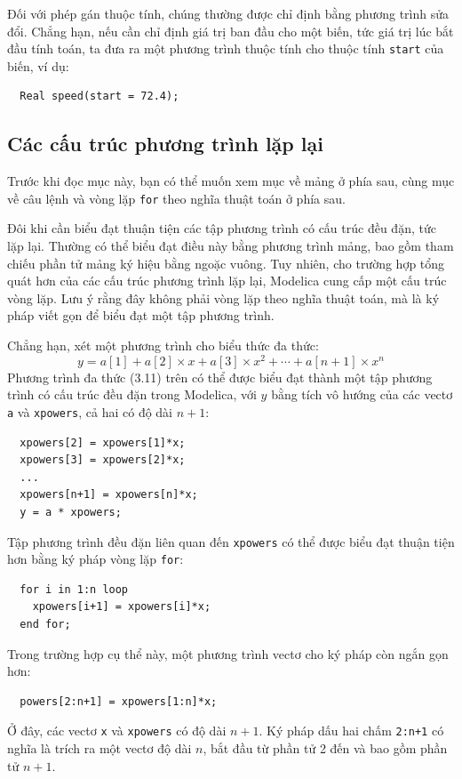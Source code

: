 Đối với phép gán thuộc tính, chúng thường được chỉ định bằng phương trình sửa đổi. Chẳng hạn, nếu cần chỉ định giá trị ban đầu cho một biến, tức giá trị lúc bắt đầu tính toán, ta đưa ra một phương trình thuộc tính cho thuộc tính \texttt{start} của biến, ví dụ:
\begin{verbatim}
  Real speed(start = 72.4);
\end{verbatim}

\subsection{Các cấu trúc phương trình lặp lại}
Trước khi đọc mục này, bạn có thể muốn xem mục về mảng ở phía sau, cùng mục về câu lệnh và vòng lặp \texttt{for} theo nghĩa thuật toán ở phía sau.

Đôi khi cần biểu đạt thuận tiện các tập phương trình có cấu trúc đều đặn, tức lặp lại. Thường có thể biểu đạt điều này bằng phương trình mảng, bao gồm tham chiếu phần tử mảng ký hiệu bằng ngoặc vuông. Tuy nhiên, cho trường hợp tổng quát hơn của các cấu trúc phương trình lặp lại, Modelica cung cấp một cấu trúc vòng lặp. Lưu ý rằng đây không phải vòng lặp theo nghĩa thuật toán, mà là ký pháp viết gọn để biểu đạt một tập phương trình.

Chẳng hạn, xét một phương trình cho biểu thức đa thức:
\begin{equation}
y=a[1]+a[2]\times x+a[3]\times x^2+\cdots+a[n+1]\times x^n\tag{3.11}
\end{equation}
Phương trình đa thức (3.11) trên có thể được biểu đạt thành một tập phương trình có cấu trúc đều đặn trong Modelica, với $y$ bằng tích vô hướng của các vectơ \texttt{a} và \texttt{xpowers}, cả hai có độ dài $n+1$:
\begin{verbatim}
  xpowers[2] = xpowers[1]*x;
  xpowers[3] = xpowers[2]*x;
  ...
  xpowers[n+1] = xpowers[n]*x;
  y = a * xpowers;
\end{verbatim}
Tập phương trình đều đặn liên quan đến \texttt{xpowers} có thể được biểu đạt thuận tiện hơn bằng ký pháp vòng lặp \texttt{for}:
\begin{verbatim}
  for i in 1:n loop
    xpowers[i+1] = xpowers[i]*x;
  end for;
\end{verbatim}
Trong trường hợp cụ thể này, một phương trình vectơ cho ký pháp còn ngắn gọn hơn:
\begin{verbatim}
  powers[2:n+1] = xpowers[1:n]*x;
\end{verbatim}
Ở đây, các vectơ \texttt{x} và \texttt{xpowers} có độ dài $n+1$. Ký pháp dấu hai chấm \texttt{2:n+1} có nghĩa là trích ra một vectơ độ dài $n$, bắt đầu từ phần tử 2 đến và bao gồm phần tử $n+1$.

